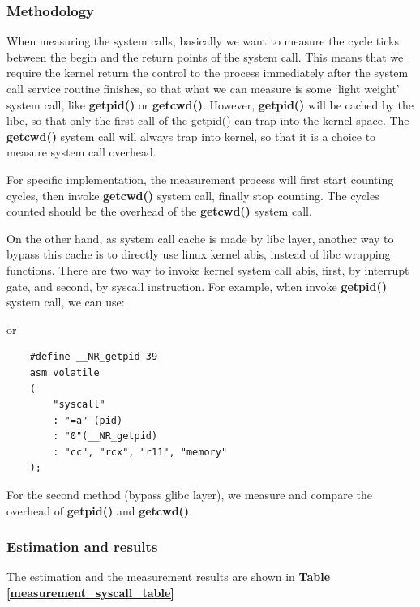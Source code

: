 \subsubsection{Methodology}

When measuring the system calls, basically we want to measure the cycle ticks between the begin and the return points of the system call. This means that we require the kernel return the control to the process immediately after the system call service routine finishes, so that what we can measure is some `light weight' system call, like \textbf{getpid()} or \textbf{getcwd()}. However, \textbf{getpid()} will be cached by the libc, so that only the first call of the getpid() can trap into
the kernel space. The \textbf{getcwd()} system call will always trap into kernel, so that it is a choice to measure system call overhead.

For specific implementation, the measurement process will first start counting cycles, then invoke \textbf{getcwd()} system call, finally stop counting. The cycles counted should be the overhead of the \textbf{getcwd()} system call.

On the other hand, as system call cache is made by libc layer, another way to bypass this cache is to directly use linux kernel abis, instead of libc wrapping functions. There are two way to invoke kernel system call abis, first, by interrupt gate, and second, by syscall instruction. For example, when invoke \textbf{getpid()} system call, we can use:



or

\begin{lstlisting}
    #define __NR_getpid 39
    asm volatile
    (
        "syscall"
        : "=a" (pid)
        : "0"(__NR_getpid)
        : "cc", "rcx", "r11", "memory"
    );
\end{lstlisting}

For the second method (bypass glibc layer), we measure and compare the overhead of \textbf{getpid()} and \textbf{getcwd()}.

\subsubsection{Estimation and results}

The estimation and the measurement results are shown in \textbf{Table \ref{measurement_syscall_table}}


